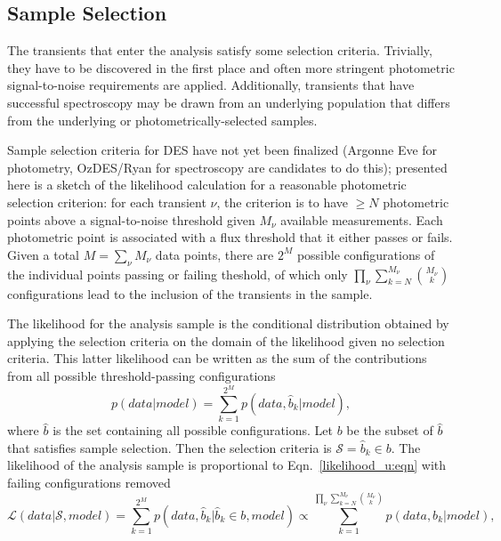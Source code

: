 \documentclass[preprint,3p]{elsarticle}
\begin{document}
\subsection{Sample Selection}
The transients that enter the analysis satisfy some selection criteria.  Trivially, they
have to be discovered in the first place and often more stringent photometric signal-to-noise
requirements are applied.  Additionally, transients that have
successful spectroscopy may be drawn from an underlying population that differs from the
underlying or photometrically-selected samples.

Sample selection criteria for DES have not yet been finalized
(Argonne Eve for photometry, OzDES/Ryan for spectroscopy are candidates to do this);
presented here is a sketch of the likelihood calculation for a reasonable
photometric selection criterion:
for each transient $\nu$, the criterion is to have $\ge N$ photometric points
above a signal-to-noise threshold given $M_\nu$ available measurements.
Each photometric point is associated with a flux threshold that it either passes
or fails.  Given a total $M=\sum_\nu M_\nu$ data points, there are
$2^M$ possible configurations
of the individual points passing or failing theshold, of which only
$\prod_\nu \sum_{k=N}^{M_{\nu}} \binom{M_{\nu}}{k}$  configurations lead to
the inclusion of the transients in the sample.

The likelihood for the analysis
sample is the conditional distribution obtained by applying the selection criteria
on the domain of the likelihood given no selection criteria.  This latter likelihood
can be written
as the sum of the contributions from all possible threshold-passing configurations
\begin{equation}
p(data|model) = \sum_{k=1}^{2^M} p(data, \hat{b}_k| model),
\label{likelihood_u:eqn}
\end{equation}
where $\hat{b}$ is the set containing all possible configurations.
Let $b$ be the subset of $\hat{b}$ 
that satisfies sample selection. Then the selection criteria is $\mathcal{S} = \hat{b}_k
\in b$.
The likelihood of the analysis sample is proportional to Eqn.~\ref{likelihood_u:eqn}
with failing configurations removed
\begin{equation}
\mathcal{L}(data|\mathcal{S}, model) =
\sum_{k=1}^{2^M} p(data, \hat{b}_k| \hat{b}_k
\in b, model) \propto \sum_{k=1}^{\prod_\nu \sum_{k=N}^{M_{\nu}} \binom{M_{\nu}}{k}} p(data, b_k| model),
\end{equation}
\end{document}

